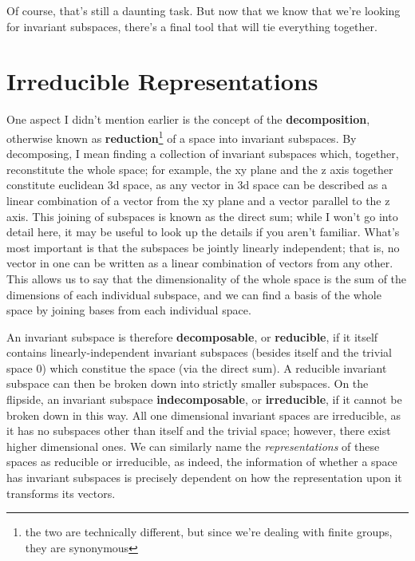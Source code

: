 \documentclass{article}
\begin{document}
Of course, that's still a daunting task. But now that we know that we're looking for invariant subspaces, there's a final tool that will tie everything together.

\section{Irreducible Representations}
One aspect I didn't mention earlier is the concept of the \textbf{decomposition}, otherwise known as \textbf{reduction}\footnote{the two are technically different, but since we're dealing with finite groups, they are synonymous} of a space into invariant subspaces. By decomposing, I mean finding a collection of invariant subspaces which, together, reconstitute the whole space; for example, the xy plane and the z axis together constitute euclidean 3d space, as any vector in 3d space can be described as a linear combination of a vector from the xy plane and a vector parallel to the z axis. This joining of subspaces is known as the direct sum; while I won't go into detail here, it may be useful to look up the details if you aren't familiar. What's most important is that the subspaces be jointly linearly independent; that is, no vector in one can be written as a linear combination of vectors from any other. This allows us to say that the dimensionality of the whole space is the sum of the dimensions of each individual subspace, and we can find a basis of the whole space by joining bases from each individual space.

An invariant subspace is therefore \textbf{decomposable}, or \textbf{reducible}, if it itself contains linearly-independent invariant subspaces (besides itself and the trivial space {0}) which constitue the space (via the direct sum). A reducible invariant subspace can then be broken down into strictly smaller subspaces. On the flipside, an invariant subspace \textbf{indecomposable}, or \textbf{irreducible}, if it cannot be broken down in this way. All one dimensional invariant spaces are irreducible, as it has no subspaces other than itself and the trivial space; however, there exist higher dimensional ones. We can similarly name the \textit{representations} of these spaces as reducible or irreducible, as indeed, the information of whether a space has invariant subspaces is precisely dependent on how the representation upon it transforms its vectors.
\end{document}
